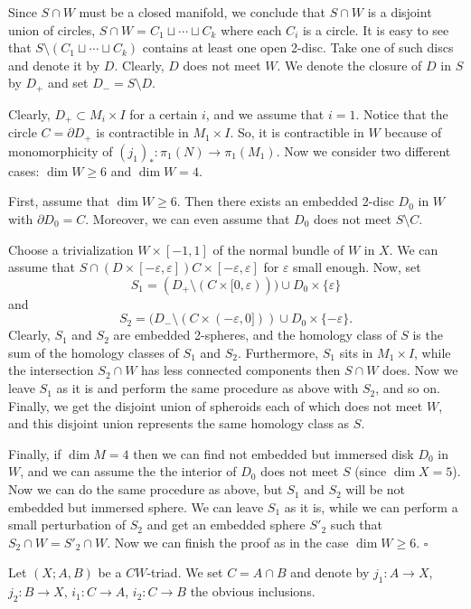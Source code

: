 \documentclass[12pt, twoside]{amsart}
\theoremstyle{plain}
\theoremstyle{definition}
\numberwithin{equation}{section}
\def\eps{\varepsilon}
\def\dim{\operatorname {dim}}
\def\hqed{\hfill\hfill$\square$}
\def\pa{\partial}
\def\m{\medskip}
\begin{document}
\m Since $S\cap W$ must be a closed manifold, we conclude that $S\cap W$ is 
a disjoint union of circles, $S\cap W=C_1\sqcup \cdots \sqcup C_k$ where 
each $C_i$ is a circle. It is easy to see that $S\setminus (C_1\sqcup \cdots 
\sqcup C_k)$ contains at least one open 2-disc. Take one of such discs and 
denote it by $D$. Clearly, $D$ does not meet $W$. We denote the closure of 
$D$ in $S$ by $D_+$ and set $D_-=S\setminus D$. 

\m Clearly, $D_+\subset M_i\times I$ for a certain $i$, and we assume that 
$i=1$. Notice that the circle $C=\pa D_+$ is contractible in $M_1\times I$. 
So, it is contractible in $W$ because of monomorphicity of $(j_1)_*:\pi_1(N) 
\to \pi_1(M_1)$. Now we consider two different cases: $\dim W \ge 6$ and $\dim 
W=4$.

First, assume that $\dim W\ge 6$. Then there exists an 
embedded 2-disc $D_0$ in $W$ with $\pa D_0=C$. Moreover, we can even assume 
that $D_0$ does not meet $S\setminus C$.

\m Choose a trivialization $W\times [-1,1]$ of the normal bundle of $W$ in 
$X$. We can assume that $S\cap (D\times [-\eps, \eps])C\times [-\eps, \eps]$ 
for 
$\eps$ small enough. 
Now, set 
$$
S_1=(D_+\setminus (C\times [0,\eps)))\cup D_0\times \{\eps\}
$$
and 
$$
S_2=(D_-\setminus (C\times (-\eps,0]))\cup D_0\times \{-\eps\}.
$$ 
Clearly, $S_1$ and $S_2$ are embedded 2-spheres, and the homology class of 
$S$ is the sum of the homology classes of $S_1$ and $S_2$. 
Furthermore, $S_1$ sits in $M_1\times I$, while the intersection $S_2\cap W$ 
has less connected components then $S\cap W$ does. Now we leave $S_1$ as it is 
and perform the same procedure as above with $S_2$, and so on. Finally, we get 
the disjoint union of spheroids each of which does not meet $W$, and this 
disjoint union represents the same homology class as $S$.

\m Finally, if $\dim M =4$ then we can find not embedded but immersed disk 
$D_0$ 
in $W$, and we can assume the the interior of $D_0$ does not meet $S$ (since 
$\dim X=5$). Now we can do the same procedure as above, but $S_1$ and $S_2$ 
will 
be not embedded but immersed sphere. We can leave $S_1$ as it is, while we can 
perform a small perturbation of $S_2$ and get an embedded sphere $S'_2$ such 
that $S_2\cap W=S'_2\cap W$. Now we can finish the proof as in the case $\dim 
W\ge 6$.      
\hqed

Let $(X;A,B)$ be a $CW$-triad. We set $C=A\cap B$ and denote by $j_1: A \to 
X$, 
$j_2: B \to X$, $i_1: C \to A$, $i_2: C \to B$ the obvious inclusions.
\end{document}
